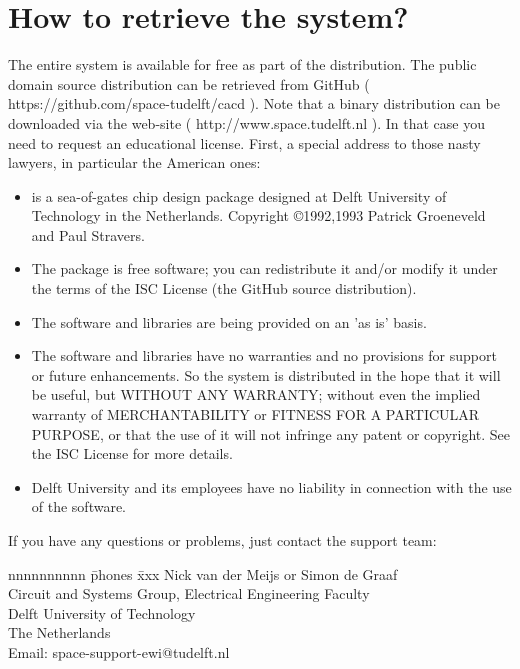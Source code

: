 \section{How to retrieve the \protect{} system?}
The entire  system is available for free as part of the  distribution.
The public domain source distribution can be retrieved from GitHub
( https://github.com/space-tudelft/cacd ).
Note that a binary distribution can be downloaded via the  web-site ( http://www.space.tudelft.nl ).
In that case you need to request an educational license.
First, a special address to those nasty lawyers, in particular the
American ones: 
\begin{itemize}
\item
{} is a sea-of-gates chip design package designed at Delft 
University of Technology in the Netherlands. Copyright \copyright 1992,1993
Patrick Groeneveld and Paul Stravers.
\item
The  package is free software; you can redistribute it and/or modify
it under the terms of the ISC License (the GitHub source distribution).
\item
The software and libraries are being provided on an 'as is' basis.
\item
The software and libraries have no warranties and no provisions for support or
future enhancements. So the system is distributed in the hope that it will be
useful, but WITHOUT ANY WARRANTY; without even the implied warranty of
MERCHANTABILITY or FITNESS FOR A PARTICULAR PURPOSE, or that the use of it
will not infringe any patent or copyright.  See the ISC License for more details.
\item
Delft University and its employees have no liability in connection with the use
of the software.
\end{itemize}

If you have any questions or problems, just contact the  support team:

\begin{tabbing}
nnnnnnnnnn \= phones \= xxx \kill
\> Nick van der Meijs or Simon de Graaf\\
\> Circuit and Systems Group, Electrical Engineering Faculty\\
\> Delft University of Technology\\
\> The Netherlands\\
\> Email: \> space-support-ewi@tudelft.nl
\end{tabbing}

